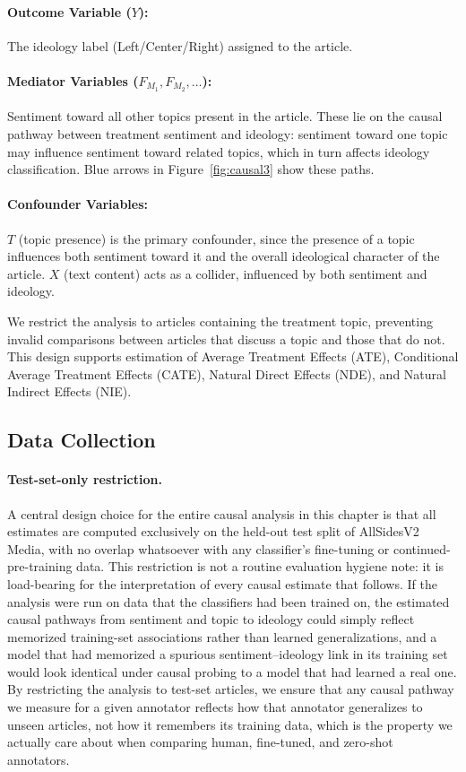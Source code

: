 \paragraph{Outcome Variable ($Y$):} The ideology label (Left/Center/Right) assigned to the article.

\paragraph{Mediator Variables ($F_{M_1}, F_{M_2}, \ldots$):} Sentiment toward all other topics present in the article. These lie on the causal pathway between treatment sentiment and ideology: sentiment toward one topic may influence sentiment toward related topics, which in turn affects ideology classification. Blue arrows in Figure~\ref{fig:causal3} show these paths.

\paragraph{Confounder Variables:} $T$ (topic presence) is the primary confounder, since the presence of a topic influences both sentiment toward it and the overall ideological character of the article. $X$ (text content) acts as a collider, influenced by both sentiment and ideology.

We restrict the analysis to articles containing the treatment topic, preventing invalid comparisons between articles that discuss a topic and those that do not. This design supports estimation of Average Treatment Effects (ATE), Conditional Average Treatment Effects (CATE), Natural Direct Effects (NDE), and Natural Indirect Effects (NIE).

\subsection{Data Collection}

\paragraph{Test-set-only restriction.} A central design choice for the entire causal analysis in this chapter is that all estimates are computed exclusively on the held-out test split of AllSidesV2 Media, with no overlap whatsoever with any classifier's fine-tuning or continued-pre-training data. This restriction is not a routine evaluation hygiene note: it is load-bearing for the interpretation of every causal estimate that follows. If the analysis were run on data that the classifiers had been trained on, the estimated causal pathways from sentiment and topic to ideology could simply reflect memorized training-set associations rather than learned generalizations, and a model that had memorized a spurious sentiment--ideology link in its training set would look identical under causal probing to a model that had learned a real one. By restricting the analysis to test-set articles, we ensure that any causal pathway we measure for a given annotator reflects how that annotator generalizes to unseen articles, not how it remembers its training data, which is the property we actually care about when comparing human, fine-tuned, and zero-shot annotators.

